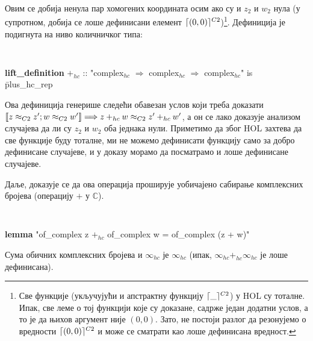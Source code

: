 {\tt
\begin{tabbing}
\textbf{definition} plus\_hc\_rep :: "C2\_vec$_{\neq 0}$ $\Rightarrow$ C2\_vec$_{\neq 0}$ $\Rightarrow$ C2\_vec$_{\neq 0}$"\\
\hspace{5mm}\=\textbf{where} "}plus\_hc\_rep $z$ $w$ = (l\=et \= ($z_1$, $z_2$) \== $\Repnzv{z}$; ($w_1$, $w_2$) = $\Repnzv{w}$ \\
  \> \> in $\Absnzv{(z_1*w_2 + w_1*z_2, z_2*w_2)})$"}
\end{tabbing}
}
\noindent Овим се добија ненула пар хомогених координата осим ако су
и $z_2$ и $w_2$ нула (у супротном, добија се лоше дефинисани елемент
{\tt $\lceil(0, 0)\rceil^{C2}$})\footnote{Све функције (укључујући и
  апстрактну функцију $\lceil\_\rceil^{C2}$) у HOL су тоталне. Ипак, све леме
  о тој функцији које су доказане, садрже један додатни услов, а то је
  да њихов аргумент није $(0, 0)$. Зато, не постоји разлог да
  резонујемо о вредности $\lceil(0, 0)\rceil^{C2}$ и може се сматрати као лоше
  дефинисана вредност.}. Дефиниција је подигнута на ниво количничког
типа:

{\tt
\begin{tabbing}
  \textbf{lift\_definition} $+_{hc}$ :: "complex$_{hc}$ $\Rightarrow$ complex$_{hc}$ $\Rightarrow$ complex$_{hc}$" is \\
  \hspace{5mm}\=plus\_hc\_rep
\end{tabbing}
}
\noindent Ова дефиниција генерише следећи обавезан услов који треба
доказати $\llbracket z \approx_{C2} z'; w \approx_{C2} w'\rrbracket
\Longrightarrow z +_{hc} w \approx_{C2} z' +_{hc} w'$, а он се лако
доказује анализом случајева да ли су $z_2$ и $w_2$ оба једнака
нули. Приметимо да због HOL захтева да све функције буду тоталне, ми
не можемо дефинисати функцију само за добро дефинисане случајеве, и у
доказу морамо да посматрамо и лоше дефинисане случајеве.

Даље, доказује се да ова операција проширује уобичајено сабирање
комплексних бројева (операцију $+$ у $\mathbb{C}$).

{\tt
\begin{tabbing}
\textbf{lemma} "of\_complex z $+_{hc}$ of\_complex w = of\_complex (z + w)"
\end{tabbing}
}

\noindent Сума обичних комплексних бројева и $\infty_{hc}$ је
$\infty_{hc}$ (ипак, $\infty_{hc} +_{hc} \infty_{hc}$ је лоше
дефинисана).

